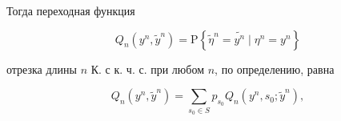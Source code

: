 \documentclass[10pt]{article}
\begin{document}
Тогда переходная функция



\[

Q_{n}\left(y^{n}, \tilde{y}^{n}\right)=\mathrm{P}\left\{\tilde{\eta}^{n}=\tilde{y^{n}} \mid \eta^{n}=y^{n}\right\}

\]



отрезка длины $n$ К. с к. ч. с. при любом $n$, по определению, равна



\[

Q_{n}\left(y^{n}, \tilde{y}^{n}\right)=\sum_{s_{0} \in S} p_{s_{0}} Q_{n}\left(y^{n}, s_{0} ; \tilde{y}^{n}\right),

\]
\end{document}
